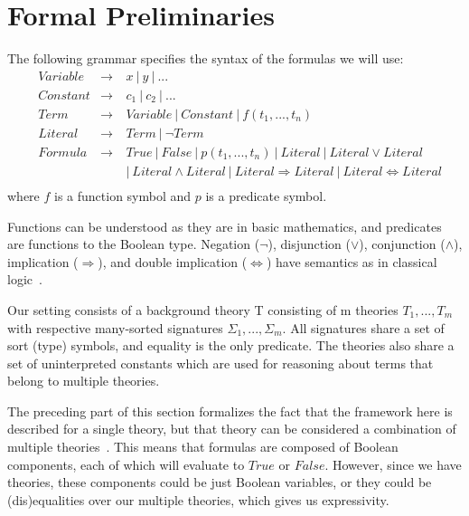 \documentclass{article}
\begin{document}
\section{Formal Preliminaries}
\label{sec:prelim}
The following grammar specifies the syntax of the formulas we
will use: 
\begin{align*}
&Variable &\rightarrow\  &x\ |\ y\ |\ ...  \\
&Constant &\rightarrow\ &c_1\ |\ c_2\ |\ ...  \\
&Term &\rightarrow\ &Variable\ |\ Constant\ |\ f(t_1, ..., t_n) \\
&Literal &\rightarrow\ &Term\ |\ \neg Term \\
&Formula &\rightarrow\ &True\ |\ False\ |\ p(t_1, ..., t_n)\ 
					|\ Literal\ |\ Literal \lor Literal \\ 
& & &				|\ Literal \land Literal\ 
					|\ Literal \Rightarrow Literal\ 
					|\ Literal \iff Literal \\
\end{align*}
where $f$ is a function symbol and $p$ is a predicate symbol.

Functions can be understood as they are in basic mathematics, 
and predicates are functions to the Boolean type. Negation 
($\neg$), disjunction ($\lor$), conjunction ($\land$), 
implication ($\Rightarrow$), and double implication
($\iff$) have semantics as in classical logic~\cite{prop}.

Our setting consists of a background theory T consisting 
of m theories $T_1, ..., T_m$ with respective many-sorted 
signatures $\Sigma_1, ..., \Sigma_m$. All signatures share 
a set of sort (type) symbols, and equality is the only 
predicate. The theories also share a set of 
uninterpreted constants which are used for reasoning about 
terms that belong to multiple theories. 

The preceding part of this section formalizes the fact 
that the framework here is 
described for a single theory, but that theory can 
be considered a combination of multiple 
theories~\cite{Manna2003}. This means that formulas are 
composed of Boolean components, each of which will 
evaluate to $True$ or $False$. However, since 
we have theories, these components could be just Boolean 
variables, or they could be (dis)equalities over our 
multiple theories, which gives us expressivity. 
\end{document}
